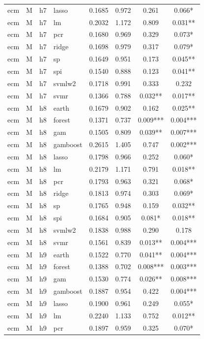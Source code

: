 \begin{ThreePartTable}
\begin{longtable}[t]{llclcccc}
ecm & M & h7 & lasso & 0.1685 & 0.972 & 0.261 & 0.066*\\
ecm & M & h7 & lm & 0.2032 & 1.172 & 0.809 & 0.031**\\
ecm & M & h7 & pcr & 0.1680 & 0.969 & 0.329 & 0.073*\\
ecm & M & h7 & ridge & 0.1698 & 0.979 & 0.317 & 0.079*\\
ecm & M & h7 & sp & 0.1649 & 0.951 & 0.173 & 0.045**\\
ecm & M & h7 & spi & 0.1540 & 0.888 & 0.123 & 0.041**\\
ecm & M & h7 & svmlw2 & 0.1718 & 0.991 & 0.333 & 0.232\\
ecm & M & h7 & svmr & 0.1366 & 0.788 & 0.032** & 0.017**\\
\addlinespace
ecm & M & h8 & earth & 0.1679 & 0.902 & 0.162 & 0.025**\\
ecm & M & h8 & forest & 0.1371 & 0.737 & 0.009*** & 0.004***\\
ecm & M & h8 & gam & 0.1505 & 0.809 & 0.039** & 0.007***\\
ecm & M & h8 & gamboost & 0.2615 & 1.405 & 0.747 & 0.002***\\
ecm & M & h8 & lasso & 0.1798 & 0.966 & 0.252 & 0.060*\\
ecm & M & h8 & lm & 0.2179 & 1.171 & 0.791 & 0.018**\\
ecm & M & h8 & pcr & 0.1793 & 0.963 & 0.321 & 0.068*\\
ecm & M & h8 & ridge & 0.1813 & 0.974 & 0.303 & 0.069*\\
ecm & M & h8 & sp & 0.1765 & 0.948 & 0.159 & 0.032**\\
ecm & M & h8 & spi & 0.1684 & 0.905 & 0.081* & 0.018**\\
ecm & M & h8 & svmlw2 & 0.1838 & 0.988 & 0.290 & 0.178\\
ecm & M & h8 & svmr & 0.1561 & 0.839 & 0.013** & 0.004***\\
\addlinespace
ecm & M & h9 & earth & 0.1522 & 0.770 & 0.041** & 0.004***\\
ecm & M & h9 & forest & 0.1388 & 0.702 & 0.008*** & 0.003***\\
ecm & M & h9 & gam & 0.1530 & 0.774 & 0.026** & 0.008***\\
ecm & M & h9 & gamboost & 0.1887 & 0.954 & 0.422 & 0.004***\\
ecm & M & h9 & lasso & 0.1900 & 0.961 & 0.249 & 0.055*\\
ecm & M & h9 & lm & 0.2240 & 1.133 & 0.752 & 0.012**\\
ecm & M & h9 & pcr & 0.1897 & 0.959 & 0.325 & 0.070*\\

\end{longtable}
\end{ThreePartTable}
